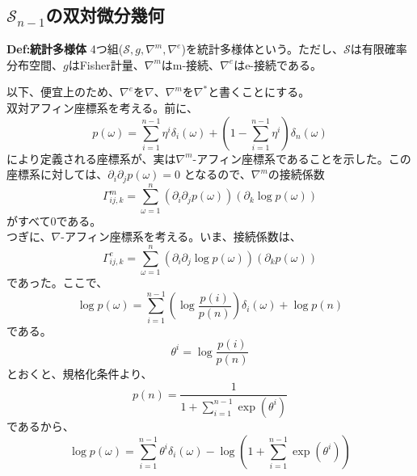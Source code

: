\documentclass[a4paper,11pt]{jsarticle}
\numberwithin{equation}{section}
\begin{document}
\subsection{$\mathcal{S}_{n-1}$の双対微分幾何}

\begin{itembox}[l]{\textbf{Def:統計多様体}}
    4つ組($\mathcal{S},g,\nabla^{m},\nabla^{e}$)を統計多様体という。ただし、$\mathcal{S}$は有限確率分布空間、$g$はFisher計量、$\nabla^{m}$はm-接続、$\nabla^{e}$はe-接続である。
\end{itembox}
以下、便宜上のため、$\nabla^{e}$を$\nabla$、$\nabla^{m}$を$\nabla^*$と書くことにする。\\

双対アフィン座標系を考える。前に、
\begin{equation}
    p(\omega) = \sum_{i=1}^{n-1} \eta^i \delta_i(\omega) + (1-\sum_{i=1}^{n-1} \eta^i) \delta_n(\omega)
\end{equation}
により定義される座標系が、実は$\nabla^{m}$-アフィン座標系であることを示した。この座標系に対しては、$\partial_i \partial_j p(\omega) = 0$
となるので、$\nabla^{m}$の接続係数
\begin{equation}
    \Gamma_{ij,k}^{m} = \sum_{\omega=1}^{n} (\partial_i \partial_j p(\omega)) (\partial_k \log p(\omega))
\end{equation}
がすべて0である。\\
つぎに、$\nabla$-アフィン座標系を考える。いま、接続係数は、
\begin{equation}
    \Gamma_{ij,k} ^{e} = \sum_{\omega=1}^{n} (\partial_i \partial_j \log p(\omega)) (\partial_k p(\omega))
\end{equation}
であった。ここで、
\begin{equation}
    \log p(\omega) = \sum_{i=1}^{n-1} \left(\log \frac{p(i)}{p(n)}\right) \delta_i(\omega) + \log p(n) 
\end{equation}
である。
\begin{equation}
\theta^i = \log \frac{p(i)}{p(n)}
\end{equation}
とおくと、規格化条件より、
\begin{equation}
    p(n) = \frac{1}{1+\sum_{i=1}^{n-1} \exp(\theta^i)} \label{eq:4}
\end{equation}
であるから、
\begin{equation}
    \log p(\omega) = \sum_{i=1}^{n-1} \theta^i \delta_i(\omega) - \log(1+\sum_{i=1}^{n-1} \exp(\theta^i))
\end{equation}
\end{document}
